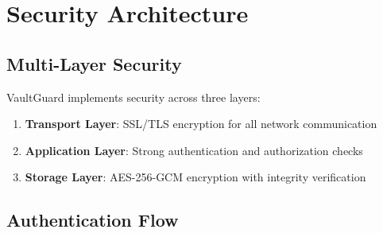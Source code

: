 \documentclass[12pt,a4paper]{report}
\begin{document}
\section{Security Architecture}

\subsection{Multi-Layer Security}

VaultGuard implements security across three layers:

\begin{enumerate}
    \item \textbf{Transport Layer}: SSL/TLS encryption for all network communication
    \item \textbf{Application Layer}: Strong authentication and authorization checks
    \item \textbf{Storage Layer}: AES-256-GCM encryption with integrity verification
\end{enumerate}

\subsection{Authentication Flow}
\end{document}
